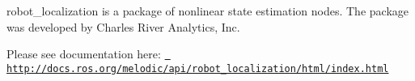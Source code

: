 robot\+\_\+localization is a package of nonlinear state estimation nodes. The package was developed by Charles River Analytics, Inc.

Please see documentation here\+: \href{http://docs.ros.org/melodic/api/robot_localization/html/index.html}{\texttt{ http\+://docs.\+ros.\+org/melodic/api/robot\+\_\+localization/html/index.\+html}} 